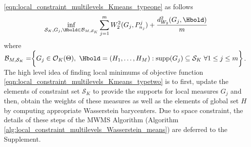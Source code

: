 \eqref{eqn:local_constraint_multilevels_Kmeans_typeone} as follows
\vspace{-6pt}
\begin{eqnarray}
\mathop {\inf }\limits_{\mathcal{S}_{K},G_{j} , \Hbold \in \mathcal{B}_{M,\mathcal{S}_{K}}}{\mathop {\sum }\limits_{j=1}^{m}{W_{2}^{2}(G_{j},P_{n_{j}}^{j})}+\dfrac{d_{W_{2}}^{2}(G_{j},\Hbold)}{m}} \label{eqn:local_constraint_multilevels_Kmeans_typetwo}
\end{eqnarray}
where  $\mathcal{B}_{M,\mathcal{S}_{K}}=\biggr\{G_{j} \in \mathcal{O}_{K}(\Theta), \ \Hbold=(H_{1},\ldots,H_{M}): 
\text{supp}(G_{j})\subseteq \mathcal{S}_{K}\ \forall 1 \leq j \leq m \biggr\}$. 
The high level idea of finding local minimums of objective function \eqref{eqn:local_constraint_multilevels_Kmeans_typetwo} 
is to first, update the elements of constraint set $\mathcal{S}_{K}$ to provide the 
supports for local measures $G_{j}$ and then, obtain the weights of these measures as 
well as the elements of global set $H$ by computing appropriate Wasserstein barycenters. 
Due to space constraint, the details of these steps of the MWMS Algorithm (Algorithm \ref{alg:local_constraint_multilevels_Wasserstein_means})
are deferred to the Supplement.
